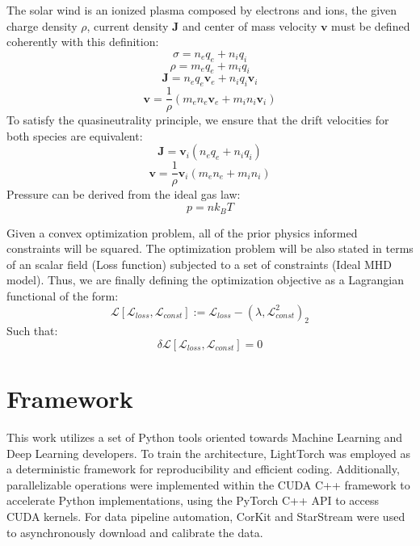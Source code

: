 \documentclass{article}
\begin{document}
The solar wind is an ionized plasma composed by electrons and ions, the given charge density $\rho$, current density $\textbf{J}$ and center of mass velocity $\textbf{v}$ must be defined coherently with this definition:
\begin{equation}
    \sigma = n_e q_e + n_i q_i
\end{equation}
\begin{equation}
    \rho = m_e q_e + m_i q_i
\end{equation}
\begin{equation}
    \textbf{J} = n_e q_e \textbf{v}_e + n_i q_i \textbf{v}_i
\end{equation}
\begin{equation}
    \textbf{v} = \frac{1}{\rho} (m_e n_e \textbf{v}_e + m_i n_i \textbf{v}_i)
\end{equation}
To satisfy the quasineutrality principle, we ensure that the drift velocities for both species are equivalent:
\begin{equation}
    \textbf{J}  = \textbf{v}_i(n_e q_e + n_i q_i)
\end{equation}
\begin{equation}
    \textbf{v} = \frac{1}{\rho} \textbf{v}_i(m_e n_e + m_i n_i)
\end{equation}
Pressure can be derived from the ideal gas law:
\begin{equation}
    p = n k_B T
\end{equation}

Given a convex optimization problem, all of the prior physics informed constraints will be squared. The optimization problem will be also stated in terms of an scalar field (Loss function) subjected to a set of constraints (Ideal MHD model). Thus, we are finally defining the optimization objective as a Lagrangian functional of the form:
\begin{equation}
    \mathcal{L} [\mathcal{L}_{loss}, \mathcal{L}_{const}] := \mathcal{L}_{loss} - (\lambda, \mathcal{L}_{const}^2)_2
\end{equation}
Such that:
\begin{equation}
    \delta \mathcal{L}[\mathcal{L}_{loss}, \mathcal{L}_{const}] = 0
\end{equation}

\section{Framework}
This work utilizes a set of Python tools oriented towards Machine Learning and Deep Learning developers. To train the architecture, LightTorch \cite{lightorch}\cite{pytorch}\cite{lightning} was employed as a deterministic framework for reproducibility and efficient coding. Additionally, parallelizable operations were implemented within the CUDA C++ framework to accelerate Python implementations, using the PyTorch C++ API to access CUDA kernels. For data pipeline automation, CorKit \cite{corkit} and StarStream \cite{starstream} were used to asynchronously download and calibrate the data.
\end{document}
